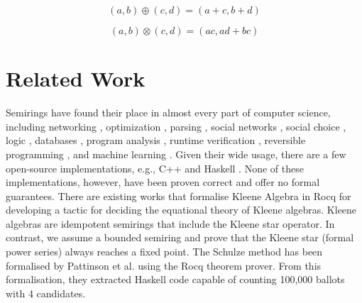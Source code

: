 \documentclass[a4paper,UKenglish,cleveref, autoref, thm-restate, anonymous]{lipics-v2021}
\begin{document}
\begin{minipage}{0.45\textwidth}
\begin{equation}\label{eq_plus}
(a, b) \oplus (c, d) = (a + c, b + d)
\end{equation}
\end{minipage}
\hfill
\begin{minipage}{0.45\textwidth}
\begin{equation}\label{eq_mul}
(a, b) \otimes (c, d) = (ac, ad + bc)
\end{equation}
\end{minipage} 

\section{Related Work}
\label{sec:related}
Semirings have found their place in almost every part of computer science, including networking \cite{10.1145/3387514.3405864,10.1145/3332466.3374533,10.1145/3230543.3230561}, optimization \cite{manger2020algebraic}, parsing \cite{10.5555/973226.973230,opedal-et-al-2023,10.5555/1609067.1609126}, social networks \cite{10.1145/2959100.2959148}, social choice \cite{Rossi2011,pini2013resistance}, logic \cite{10.1145/3531130.3533358}, databases \cite{10.1145/1265530.1265535,10.1145/2448496.2448516,10.5555/3319379.3319390,10.14778/3236187.3236200,10.14778/2140436.2140445,10.1145/3477314.3507687}, program analysis \cite{esparza2010newtonian,kincaid2021algebraic,10.1145/3453483.3454079,10.1145/3591280,10.1145/3341644}, runtime verification \cite{jakvsic2018algebraic}, reversible programming \cite{10.1007/978-3-662-49498-1_6}, and machine learning \cite{pmlr-v162-sanmarti-n22a,7888519,10.1145/3583133.3590747,10.1162/COLI_a_00198,roark2011lexicographic}. Given their wide usage, there are a few open-source implementations, e.g., C++ \cite{10.1007/978-3-319-08846-4_1,10.1007/978-3-642-45221-5_48,10.1145/3322125,10.1007/978-3-540-76336-9_3} and Haskell \cite{10.1145/2544174.2500613,erwig2021explainable}. None of these implementations, however, have been proven correct and offer no formal guarantees. There are existing works that formalise Kleene Algebra \cite{10.1007/978-3-642-14052-5_13,MOREIRA2015377} in Rocq 
for developing a tactic for deciding the equational theory of Kleene algebras. Kleene algebras are idempotent semirings that include the Kleene star operator.  In contrast, we assume a bounded semiring and prove that the Kleene star (formal power series) always reaches a fixed point. The Schulze method has been formalised by Pattinson et al. \cite{pattinson2017schulze} using the Rocq theorem prover. From this formalisation, they extracted Haskell code capable of counting 100,000 ballots with 4 candidates. 
\end{document}
